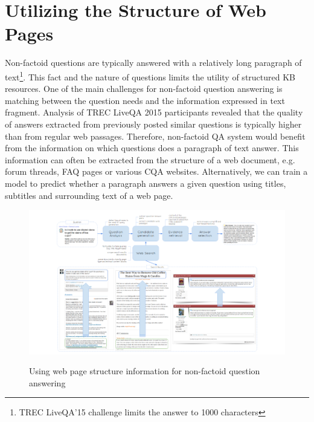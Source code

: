 %



\noindent

\section{Utilizing the Structure of Web Pages}

Non-factoid questions are typically answered with a relatively long paragraph of text\footnote{TREC LiveQA'15 challenge limits the answer to 1000 characters}.
This fact and the nature of questions limits the utility of structured KB resources.
One of the main challenges for non-factoid question answering is matching between the question needs and the information expressed in text fragment.
Analysis of TREC LiveQA 2015 participants \cite{savenkov2015liveqa} revealed that the quality of answers extracted from previously posted similar questions is typically higher than from regular web passages.
Therefore, non-factoid QA system would benefit from the information on which questions does a paragraph of text answer.
This information can often be extracted from the structure of a web document, e.g. forum threads, FAQ pages or various CQA websites.
Alternatively, we can train a model to predict whether a paragraph answers a given question using titles, subtitles and surrounding text of a web page.

\begin{figure}
\centering
\includegraphics[width=\textwidth]{img/web_page_structure_nonfactoid}
\label{fig:web_page_structure_nonfactoid}
\caption{Using web page structure information for non-factoid question answering}
\end{figure}

